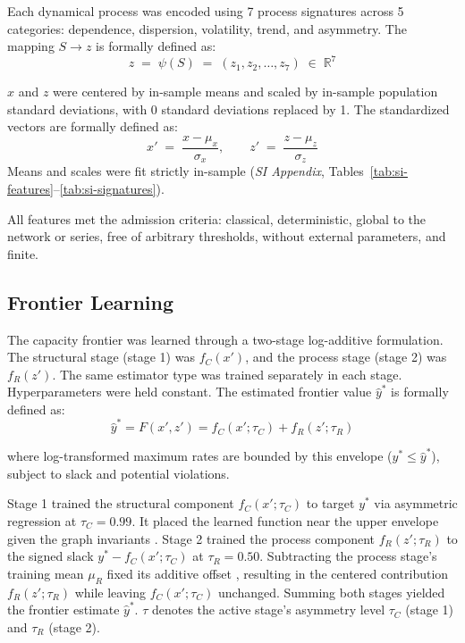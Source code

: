 \documentclass{article}
\begin{document}
Each dynamical process was encoded using 7 process signatures across 5 categories: dependence, dispersion, volatility, trend, and asymmetry. The mapping $S \to z$ is formally defined as:
\begin{equation}
    z \;=\; \psi(S) \;=\; (z_1, z_2, \ldots, z_7) \;\in\; \mathbb{R}^{7}
\label{eq:signatures}
\end{equation}

$x$ and $z$ were centered by in-sample means and scaled by in-sample population standard deviations, with 0 standard deviations replaced by 1. The standardized vectors are formally defined as:
\begin{equation}
x' \;=\; \frac{x - \mu_x}{\sigma_x},
\qquad
z' \;=\; \frac{z - \mu_z}{\sigma_z}
\label{eq:standardize}
\end{equation}
Means and scales were fit strictly in-sample (\textit{SI Appendix}, Tables~\ref{tab:si-features}--\ref{tab:si-signatures}). 

All features met the admission criteria: classical, deterministic, global to the network or series, free of arbitrary thresholds, without external parameters, and finite.

\subsection*{Frontier Learning}
\label{sec:frontier-learning}
The capacity frontier was learned through a two-stage log-additive formulation. The structural stage (stage 1) was $f_C(x')$, and the process stage (stage 2) was $f_R(z')$. The same estimator type was trained separately in each stage. Hyperparameters were held constant. The estimated frontier value $\widehat{y}^*$ is formally defined as:
\begin{equation}
\widehat{y}^* = F(x', z') = f_C(x'; \tau_C) + f_R(z'; \tau_R)
\label{eq:frontier}
\end{equation}

where log-transformed maximum rates are bounded by this envelope ($y^* \leq \widehat{y}^*$), subject to slack and potential violations.
\clearpage

Stage 1 trained the structural component $f_C(x'; \tau_C)$ to target $y^{*}$ via asymmetric regression at $\tau_C = 0.99$. It placed the learned function near the upper envelope given the graph invariants \citep{ref29}. Stage 2 trained the process component $f_R(z'; \tau_R)$ to the signed slack $y^{*} - f_C(x'; \tau_C)$ at $\tau_R = 0.50$. Subtracting the process stage's training mean $\mu_R$ fixed its additive offset \citep{ref67}, resulting in the centered contribution $f_R(z'; \tau_R)$ while leaving $f_C(x'; \tau_C)$ unchanged. Summing both stages yielded the frontier estimate $\widehat{y}^*$. $\tau$ denotes the active stage's asymmetry level $\tau_C$ (stage 1) and $\tau_R$ (stage 2).
\end{document}
